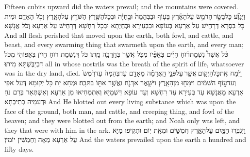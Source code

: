{Fifteen cubits upward did the waters prevail; and the mountains were covered.}{}
{וַיִּגְוַ֞ע כׇּל\maqqaf בָּשָׂ֣ר \legarmeh  הָרֹמֵ֣שׂ עַל\maqqaf הָאָ֗רֶץ בָּע֤וֹף וּבַבְּהֵמָה֙ וּבַ֣חַיָּ֔ה וּבְכׇל\maqqaf הַשֶּׁ֖רֶץ הַשֹּׁרֵ֣ץ עַל\maqqaf הָאָ֑רֶץ וְכֹ֖ל הָאָדָֽם׃}
{וּמִית כָּל בִּסְרָא דְּרָחֵישׁ עַל אַרְעָא בְּעוֹפָא וּבִבְעִירָא וּבְחַיְתָא וּבְכָל רִחְשָׁא דְּרָחֵישׁ עַל אַרְעָא וְכֹל אֲנָשָׁא׃}
{And all flesh perished that moved upon the earth, both fowl, and cattle, and beast, and every swarming thing that swarmeth upon the earth, and every man;}{}
{כֹּ֡ל אֲשֶׁר֩ נִשְׁמַת\maqqaf ר֨וּחַ חַיִּ֜ים בְּאַפָּ֗יו מִכֹּ֛ל אֲשֶׁ֥ר בֶּחָֽרָבָ֖ה מֵֽתוּ׃}
{כֹּל דְּנִשְׁמַת רוּחַ חַיִין בְּאַפּוֹהִי מִכֹּל דִּבְיַבֶּשְׁתָּא מִיתוּ׃}
{all in whose nostrils was the breath of the spirit of life, whatsoever was in the dry land, died.}{}
{וַיִּ֜מַח אֶֽת\maqqaf כׇּל\maqqaf הַיְק֣וּם \legarmeh  אֲשֶׁ֣ר \legarmeh  עַל\maqqaf פְּנֵ֣י הָֽאֲדָמָ֗ה מֵאָדָ֤ם עַד\maqqaf בְּהֵמָה֙ עַד\maqqaf רֶ֙מֶשׂ֙ וְעַד\maqqaf ע֣וֹף הַשָּׁמַ֔יִם וַיִּמָּח֖וּ מִן\maqqaf הָאָ֑רֶץ וַיִּשָּׁ֧אֶר אַךְ\maqqaf נֹ֛חַ וַֽאֲשֶׁ֥ר אִתּ֖וֹ בַּתֵּבָֽה׃}
{וּמְחָא יָת כָּל יְקוּמָא דְּעַל אַפֵּי אַרְעָא מֵאֲנָשָׁא עַד בְּעִירָא עַד רִחְשָׁא וְעַד עוֹפָא דִּשְׁמַיָּא וְאִתְמְחִיאוּ מִן אַרְעָא וְאִשְׁתְּאַר בְּרַם נֹחַ וּדְעִמֵּיהּ בְּתֵיבְתָא׃}
{And He blotted out every living substance which was upon the face of the ground, both man, and cattle, and creeping thing, and fowl of the heaven; and they were blotted out from the earth; and Noah only was left, and they that were with him in the ark.}{}
{וַיִּגְבְּר֥וּ הַמַּ֖יִם עַל\maqqaf הָאָ֑רֶץ חֲמִשִּׁ֥ים וּמְאַ֖ת יֽוֹם׃}
{וּתְקִיפוּ מַיָּא עַל אַרְעָא מְאָה וְחַמְשִׁין יוֹמִין׃}
{And the waters prevailed upon the earth a hundred and fifty days.}{}

